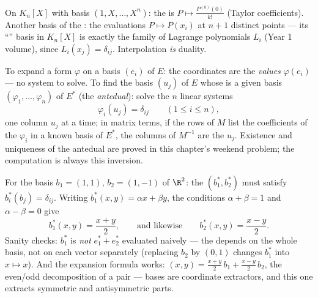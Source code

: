 \begin{example}\label{ex:b2:linalg:dualexamples}
On $K_n[X]$ with basis $(1, X, \dots, X^n)$: the  is $P
\mapsto \frac{P^{(k)}(0)}{k!}$ (Taylor coefficients). Another basis
of the : the evaluations $P \mapsto P(x_i)$ at $n + 1$ distinct
points --- its ``'' basis in $K_n[X]$ is exactly the family
of Lagrange polynomials $L_i$ (Year 1 volume), since $L_i(x_j) =
\delta_{ij}$. Interpolation \emph{is} duality.
\end{example}

\begin{method}\label{met:b2:linalg:dualbasis}
To expand a form $\varphi$ on a basis $(e_i)$ of $E$: the
coordinates are the \emph{values} $\varphi(e_i)$ --- no system to
solve. To find the basis $(u_j)$ of $E$ whose  is a given
basis $(\varphi_1, \dots, \varphi_n)$ of $E^*$ (the
\emph{antedual}): solve the $n$ linear systems
\[
\varphi_i(u_j) = \delta_{ij} \qquad (1 \leq i \leq n),
\]
one column $u_j$ at a time; in matrix terms, if the rows of $M$
list the coefficients of the $\varphi_i$ in a known basis of
$E^*$, the columns of $M^{-1}$ are the $u_j$. Existence and
uniqueness of the antedual are proved in this chapter's weekend
problem; the computation is always this inversion.
\end{method}

\begin{example}\label{ex:b2:linalg:dualbasis2d}
For the basis $b_1 = (1, 1)$, $b_2 = (1, -1)$ of $\R^2$: the
 $(b_1^*, b_2^*)$ must satisfy $b_i^*(b_j) =
\delta_{ij}$. Writing $b_1^*(x, y) = \alpha x + \beta y$, the
conditions $\alpha + \beta = 1$ and $\alpha - \beta = 0$ give
\[
b_1^*(x, y) = \frac{x + y}{2},
\qquad\text{and likewise}\qquad
b_2^*(x, y) = \frac{x - y}{2} .
\]
Sanity checks: $b_1^*$ is \emph{not} $e_1^* + e_2^*$ evaluated
naively --- the  depends on the whole basis, not on
each vector separately (replacing $b_2$ by $(0, 1)$ changes
$b_1^*$ into $x \mapsto x$). And the expansion formula works:
$(x, y) = \frac{x+y}2\,b_1 + \frac{x-y}2\,b_2$, the even/odd
decomposition of a pair ---  bases are coordinate
extractors, and this one extracts symmetric and antisymmetric
parts.
\end{example}

